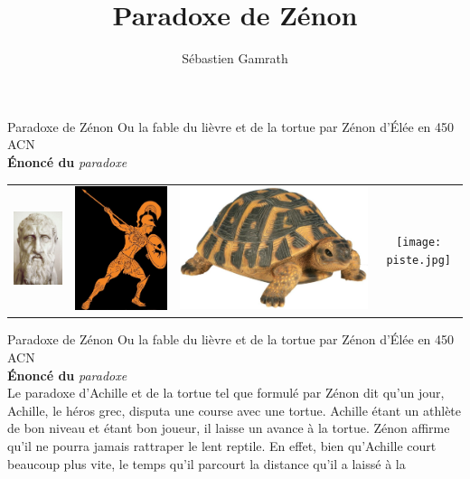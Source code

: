 \documentclass[11pt]{beamer}
\author{Sébastien Gamrath}
\title{Paradoxe de Zénon}
\begin{document}
\begin{frame}{Paradoxe de Zénon}
\pause Ou la fable du lièvre et de la tortue par Zénon d'\'{E}lée en 450 ACN
\pause 	\vspace{0.5cm}
\\ \color{umons-red} \textbf{\'{E}noncé du} \textit{paradoxe}
\pause
\begin{tabular}{cccc|}
\includegraphics[scale=0.2]{Zenon.jpg}\pause	& \includegraphics[scale=0.49]{Achilles.jpg} \pause & \includegraphics[scale=0.08]{tortue.jpg} \pause & \texttt{[image: piste.jpg]}  \\ 
\end{tabular} 
\end{frame}
\begin{frame}{Paradoxe de Zénon}
	 Ou la fable du lièvre et de la tortue par Zénon d'\'{E}lée en 450 ACN
	\vspace{0.5cm}
	 \\ \color{umons-red} \textbf{\'{E}noncé du} \textit{paradoxe}
	 \\ \color{black}Le paradoxe d'Achille et de la tortue tel que formulé par Zénon dit qu'un jour, Achille, le héros grec, disputa une course avec une tortue. Achille étant un athlète de bon niveau et étant bon joueur, il laisse un avance à la tortue. Zénon affirme qu'il ne pourra jamais rattraper le lent reptile. En effet, bien qu'Achille court beaucoup plus vite, le temps qu'il parcourt la distance qu'il a laissé à la 
\end{frame}
\end{document}
